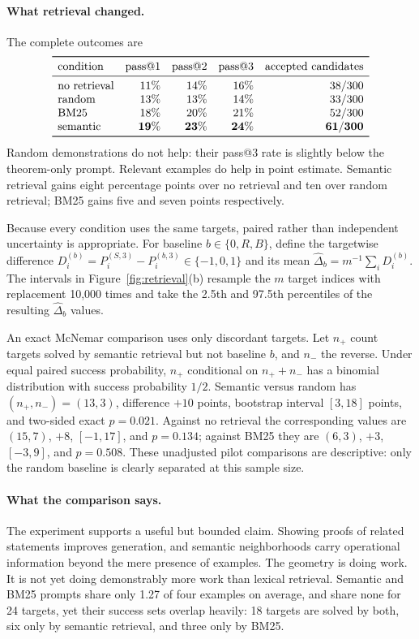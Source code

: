 \documentclass[11pt]{article}
\begin{document}
\paragraph{What retrieval changed.}
The complete outcomes are
\[
\begin{array}{lrrrr}
\toprule
\text{condition} & \text{pass@1} & \text{pass@2} & \text{pass@3} & \text{accepted candidates}\\
\midrule
\text{no retrieval} & 11\% & 14\% & 16\% & 38/300\\
\text{random}       & 13\% & 13\% & 14\% & 33/300\\
\text{BM25}         & 18\% & 20\% & 21\% & 52/300\\
\text{semantic}     & \mathbf{19\%} & \mathbf{23\%} & \mathbf{24\%} & \mathbf{61/300}\\
\bottomrule
\end{array}
\]
Random demonstrations do not help: their pass@3 rate is slightly below the theorem-only prompt.
Relevant examples do help in point estimate.  Semantic retrieval gains eight percentage points over
no retrieval and ten over random retrieval; BM25 gains five and seven points respectively.

Because every condition uses the same targets, paired rather than independent uncertainty is
appropriate.  For baseline $b\in\{0,R,B\}$, define the targetwise difference
$D_i^{(b)}=P_i^{(S,3)}-P_i^{(b,3)}\in\{-1,0,1\}$ and its mean
$\widehat\Delta_b=m^{-1}\sum_iD_i^{(b)}$.  The intervals in Figure~\ref{fig:retrieval}(b)
resample the $m$ target indices with replacement 10,000 times and take the 2.5th and 97.5th
percentiles of the resulting $\widehat\Delta_b$ values.

An exact McNemar comparison uses only discordant targets.  Let $n_+$ count targets solved by
semantic retrieval but not baseline $b$, and $n_-$ the reverse.  Under equal paired success
probability, $n_+$ conditional on $n_++n_-$ has a binomial distribution with success probability
$1/2$.  Semantic versus random has $(n_+,n_-)=(13,3)$, difference $+10$ points, bootstrap interval
$[3,18]$ points, and two-sided exact $p=0.021$.  Against no retrieval the corresponding values are
$(15,7)$, $+8$, $[-1,17]$, and $p=0.134$; against BM25 they are $(6,3)$, $+3$, $[-3,9]$, and
$p=0.508$.  These unadjusted pilot comparisons are descriptive: only the random baseline is clearly
separated at this sample size.

\paragraph{What the comparison says.}
The experiment supports a useful but bounded claim.  Showing proofs of related statements improves
generation, and semantic neighborhoods carry operational information beyond the mere presence of
examples.  The geometry is doing work.  It is not yet doing demonstrably more work than lexical
retrieval.  Semantic and BM25 prompts share only 1.27 of four examples on average, and share none
for 24 targets, yet their success sets overlap heavily: 18 targets are solved by both, six only by
semantic retrieval, and three only by BM25.
\end{document}
